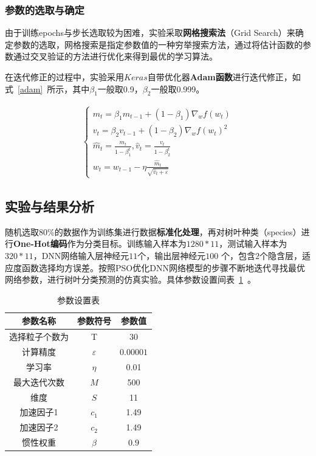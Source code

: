 \documentclass{whutmod}
\begin{document}
	\subsubsection{参数的选取与确定}
	由于训练epochs与步长选取较为困难，实验采取\textbf{网格搜索法}（Grid Search）来确定参数的选取，网格搜索是指定参数值的一种穷举搜索方法，通过将估计函数的参数通过交叉验证的方法进行优化来得到最优的学习算法。
	
	在迭代修正的过程中，实验采用$Keras$自带优化器\textbf{Adam函数}进行迭代修正，如式~\ref{adam}~所示，其中$\beta_{1}$一般取0.9，$\beta_{2}$一般取0.999。
	
	\begin{gather}\label{adam}
	\left\{\begin{array}{l}{m_{t}=\beta_{1} m_{t-1}+\left(1-\beta_{1}\right) \nabla_{w} f\left(w_{t}\right)} \\ {v_{t}=\beta_{2} v_{t-1}+\left(1-\beta_{2}\right) \nabla_{w} f\left(w_{t}\right)^{2}} \\ {\widehat{m}_{t}=\frac{m_{t}}{1-\beta_{1}^{t}}, \hat{v}_{t}=\frac{v_{t}}{1-\beta_{2}^{t}}} \\ {w_{t}=w_{t-1}-\eta \frac{\widehat{m}_{t}}{\sqrt{\hat{v}_{t}+\varepsilon}}}\end{array}\right.
	\end{gather}


	\subsection{实验与结果分析}
	随机选取80\%的数据作为训练集进行数据\textbf{标准化处理}，再对树叶种类（species）进行\textbf{One-Hot编码}作为分类目标。训练输入样本为$1280*11$，测试输入样本为$320*11$，DNN网络输入层神经元$11$个，输出层神经元$100$ 个，包含$2$个隐含层，适应度函数选择均方误差。按照PSO优化DNN网络模型的步骤不断地迭代寻找最优网络参数，进行树叶分类预测的仿真实验。具体参数设置间表~\ref{canshu}~。
			\begin{table}[H]
		\centering		\caption{参数设置表}\label{canshu}
		\begin{tabular}{ccc}
			\toprule[2pt]
			\multicolumn{1}{m{4cm}}{\centering 参数名称}
			& \multicolumn{1}{m{3cm}}{\centering 参数符号}
			&\multicolumn{1}{m{3cm}}{\centering 参数值}
			\\
			\midrule[1pt]
			选择粒子个数为	 &  T &$30$ \\ 
			计算精度	 &  $\varepsilon$&$0.00001$  \\ 
			学习率	 &  $\eta $ &0.01 \\ 
			最大迭代次数	 &  $M$ &500\\ 
						维度	 &  $S$ &11 \\ 
									加速因子1	 &  $c_{1}$ &1.49\\ 
												加速因子2	 &  $c_{2}$ &1.49 \\ 
			惯性权重	 &  $\beta $ &$0.9$ \\ 
			\bottomrule[2pt]	
		\end{tabular}

	\end{table}
	
\end{document}
